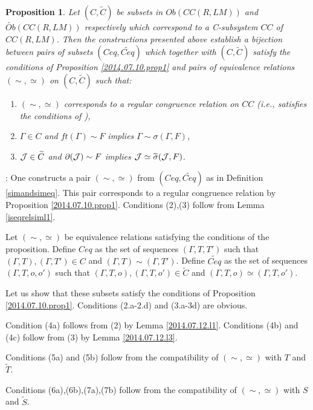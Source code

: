 \documentclass[11pt]{article}
\newenvironment{proof}{{\bf Proof}:}{\vskip 5mm }
\newtheorem{proposition}{Proposition}[subsection]
\newcommand{\llabel}[1]{\label{#1}}
\newcommand{\wt}{\widetilde}
\begin{document}
\begin{proposition}
\llabel{2014.07.10.prop2}
Let $(C,\wt{C})$ be subsets in $Ob(CC(R,LM))$ and $\wt{Ob}(CC(R,LM))$ respectively which correspond to a C-subsystem $CC$ of $CC(R,LM)$. Then the constructions presented above establish a bijection between pairs of subsets $(Ceq,\wt{Ceq})$ which together with $(C,\wt{C})$ satisfy the conditions of Proposition \ref{2014.07.10.prop1} and pairs of equivalence relations $(\sim,\simeq)$ on $(C,\wt{C})$ such that:
%
\begin{enumerate}
\item $(\sim,\simeq)$ corresponds to a regular congruence relation on $CC$ (i.e., satisfies the conditions of \cite[Proposition 5.4]{Csubsystems}),
%
\item $\Gamma\in C$ and $ft(\Gamma)\sim F$ implies $\Gamma\sim \sigma(\Gamma,F)$,
%
\item ${\cal J}\in \wt{C}$ and $\partial({\cal J})\sim F$ implies ${\cal J}\simeq \wt{\sigma}({\cal J},F)$.
\end{enumerate}
\end{proposition}
%
\begin{proof}
One constructs a pair $(\sim,\simeq)$ from $(Ceq,\wt{Ceq})$ as in Definition \ref{simandsimeq}. 
This pair corresponds to a regular congruence relation by Proposition \ref{2014.07.10.prop1}.
Conditions (2),(3) follow from Lemma \ref{iseqrelsiml1}.

Let $(\sim,\simeq)$ be equivalence relations satisfying the conditions of the proposition. Define $Ceq$ as the set of sequences $(\Gamma,T,T')$ such that $(\Gamma,T), (\Gamma,T')\in C$ and $(\Gamma,T)\sim (\Gamma,T')$. Define $\wt{Ceq}$ as the set of sequences $(\Gamma,T,o,o')$ such that $(\Gamma,T,o),(\Gamma,T,o')\in \wt{C}$ and $(\Gamma,T,o)\simeq (\Gamma,T,o')$. 

Let us show that these subsets satisfy the conditions of Proposition \ref{2014.07.10.prop1}. Conditions (2.a-2.d) and (3.a-3d) are obvious. 

Condition (4a) follows from (2) by Lemma \ref{2014.07.12.l1}.
Conditions (4b) and (4c) follow from (3) by Lemma \ref{2014.07.12.l3}.

Conditions (5a) and (5b) follow from the compatibility of $(\sim,\simeq)$ with $T$ and $\wt{T}$. 

Conditions (6a),(6b),(7a),(7b) follow from the compatibility of $(\sim,\simeq)$ with $S$ and $\wt{S}$.
\end{proof}
\end{document}
